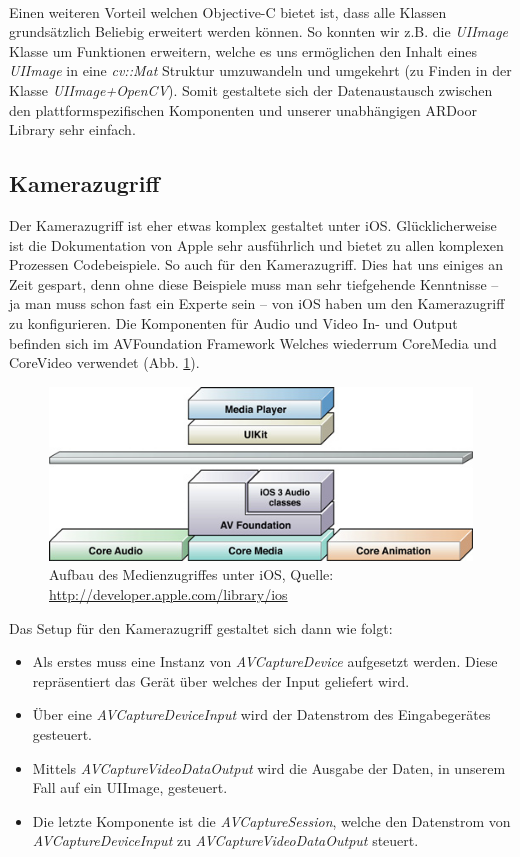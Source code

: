 \paragraph{}
Einen weiteren Vorteil welchen Objective-C bietet ist, dass alle Klassen grundsätzlich Beliebig erweitert werden können. So konnten wir z.B. die \textit{UIImage} Klasse um Funktionen erweitern, welche es uns ermöglichen den Inhalt eines \textit{UIImage} in eine \textit{cv::Mat} Struktur umzuwandeln und umgekehrt (zu Finden in der Klasse \textit{UIImage+OpenCV}). Somit gestaltete sich der Datenaustausch zwischen den plattformspezifischen Komponenten und unserer unabhängigen ARDoor Library sehr einfach.

\subsection{Kamerazugriff} Der Kamerazugriff ist eher etwas komplex gestaltet unter iOS. Glücklicherweise ist die Dokumentation von Apple sehr ausführlich und bietet zu allen komplexen Prozessen Codebeispiele. So auch für den Kamerazugriff. Dies hat uns einiges an Zeit gespart, denn ohne diese Beispiele muss man sehr tiefgehende Kenntnisse – ja man muss schon fast ein Experte sein – von iOS haben um den Kamerazugriff zu konfigurieren. Die Komponenten für Audio und Video In- und Output befinden sich im AVFoundation Framework Welches wiederrum CoreMedia und CoreVideo verwendet (Abb. \ref{fig:avfoundation}).

\begin{figure}[!ht]
\centering
\includegraphics[scale=0.6]{images/avfoundation.jpg} 
\caption{Aufbau des Medienzugriffes unter iOS, Quelle: \protect\url{http://developer.apple.com/library/ios}}
\label{fig:avfoundation}
\end{figure}

Das Setup für den Kamerazugriff gestaltet sich dann wie folgt:

\begin{itemize}
\item Als erstes muss eine Instanz von \textit{AVCaptureDevice} aufgesetzt werden. Diese repräsentiert das Gerät über welches der Input geliefert wird.
\item Über eine \textit{AVCaptureDeviceInput} wird der Datenstrom des Eingabegerätes gesteuert.
\item Mittels \textit{AVCaptureVideoDataOutput} wird die Ausgabe der Daten, in unserem Fall auf ein UIImage, gesteuert.
\item Die letzte Komponente ist die \textit{AVCaptureSession}, welche den Datenstrom von \textit{AVCaptureDeviceInput} zu \textit{AVCaptureVideoDataOutput} steuert.
\end{itemize}

